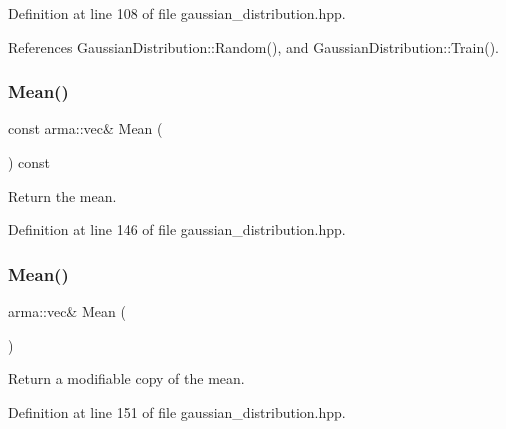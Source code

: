 Definition at line 108 of file gaussian\+\_\+distribution.\+hpp.



References Gaussian\+Distribution\+::\+Random(), and Gaussian\+Distribution\+::\+Train().

\mbox{\label{classmlpack_1_1distribution_1_1GaussianDistribution_a6db5f5d76cbd055347cecd9ca90eea86}} 
\subsubsection{Mean()\hspace{0.1cm}{\footnotesize\ttfamily [1/2]}}
{\footnotesize\ttfamily const arma\+::vec\& Mean (\begin{DoxyParamCaption}{ }\end{DoxyParamCaption}) const\hspace{0.3cm}{\ttfamily [inline]}}



Return the mean. 



Definition at line 146 of file gaussian\+\_\+distribution.\+hpp.

\mbox{\label{classmlpack_1_1distribution_1_1GaussianDistribution_a94becb1cd872c0334328c37f130db253}} 
\subsubsection{Mean()\hspace{0.1cm}{\footnotesize\ttfamily [2/2]}}
{\footnotesize\ttfamily arma\+::vec\& Mean (\begin{DoxyParamCaption}{ }\end{DoxyParamCaption})\hspace{0.3cm}{\ttfamily [inline]}}



Return a modifiable copy of the mean. 



Definition at line 151 of file gaussian\+\_\+distribution.\+hpp.

